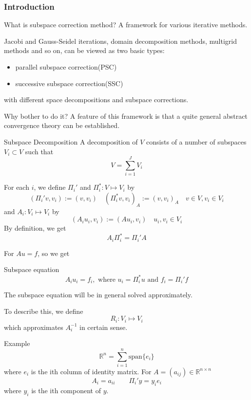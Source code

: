 \begin{frame}
\frametitle{Introduction}
\begin{block}{What is subspace correction method?}
A framework for various iterative methods.
\end{block}
Jacobi and
Gauss-Seidel iterations, domain decomposition methods,
multigrid methods and so on, 
can be viewed as two basic types:
\begin{itemize}
\item parallel subspace correction(PSC)
\item successive subspace correction(SSC)
\end{itemize}
with different 
space decompositions and subspace corrections.

\begin{block}{Why bother to do it?}
A feature of this framework is that a quite general 
abstract convergence theory can be established.
\end{block}
\end{frame}

\begin{frame}
\begin{block}{Subspace Decomposition}
A decomposition of $V$ consists of a number of subspaces
$V_i \subset V$ such that
$$V=\sum_{i=1}^JV_i$$
\end{block}

For each $i$, we define $\Pi_i'$ and $\Pi_i^*: V \mapsto V_i$ by 
$$(\Pi_i'v,v_i):=(v,v_i)\quad (\Pi_i^*v,v_i)_A:=(v,v_i)_A
\quad v\in V,v_i\in V_i$$
and $A_i:V_i \mapsto V_i$ by
$$(A_iu_i,v_i):=(Au_i,v_i)\quad u_i,v_i \in V_i$$
By definition, we get
$$A_i\Pi_i^*=\Pi_i'A$$

For $Au=f$, so we get
\begin{block}{Subspace equation}
$$A_i u_i =f_i,
\text{ where } u_i=\Pi_i^* u
\text{ and }f_i=\Pi_i'f$$
\end{block}
\end{frame}

\begin{frame}
The subspace equation will be in general solved approximately.

To describe this, we define $$R_i: V_i \mapsto V_i$$
which approximates 
$A_i^{-1}$ in certain sense.

\begin{block}{Example}
$$\mathbb{R}^n=\sum_{i=1}^{n}\mathrm{span}\{e_i\}$$
where $e_i$ is the ith column of identity matrix.
For $A=(a_{ij})\in \mathbb{R}^{n \times n}$
$$A_i=a_{ii}\qquad \Pi_i'y=y_i e_i$$
where $y_i$ is the ith component of $y$.
\end{block}

\end{frame}


